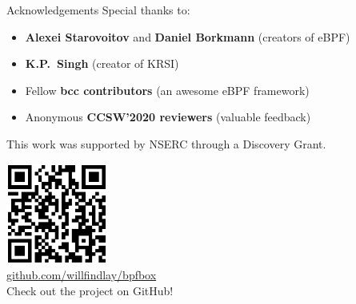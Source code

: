\documentclass[12pt, dvipsnames]{beamer}
\begin{document}
\begin{frame}[c]{Acknowledgements}
Special thanks to:
\begin{itemize}
    \item \textbf{Alexei Starovoitov} and \textbf{Daniel Borkmann} (creators of eBPF)
    \item \textbf{K.P.~Singh} (creator of KRSI)
    \item Fellow \textbf{bcc contributors} (an awesome eBPF framework)
    \item Anonymous \textbf{CCSW'2020 reviewers} (valuable feedback)
\end{itemize}
This work was supported by NSERC through a Discovery Grant.
\begin{center}
    \includegraphics[width=0.25\textwidth]{figs/bpfbox-qrcode.eps}\\
    \href{https://github.com/willfindlay/bpfbox}{\ttfamily github.com/willfindlay/bpfbox}\\
    Check out the project on GitHub!
\end{center}
\end{frame}
\end{document}
